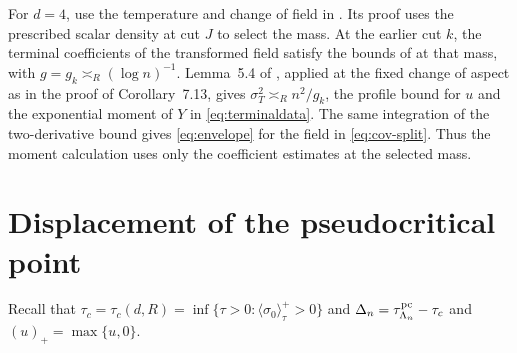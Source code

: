 \documentclass[11pt]{article}
\numberwithin{equation}{section}
\begin{document}
For $d=4$, use the temperature and change of field in
\cite[Corollary~7.13]{base}. Its proof uses the prescribed scalar
density at cut $J$ to select the mass. At the earlier cut $k$, the
terminal coefficients of the transformed field satisfy the bounds of
\cite[Proposition~7.2]{base} at that mass, with
$g=g_k\asymp_R(\log n)^{-1}$. Lemma~5.4 of \cite{base}, applied
at the fixed change of aspect as in the proof of Corollary~7.13,
gives $\sigma_T^2\asymp_R n^2/g_k$, the profile bound for $u$ and
the exponential moment of $Y$ in \eqref{eq:terminaldata}. The
same integration of the two-derivative bound gives \eqref{eq:envelope}
for the field in \eqref{eq:cov-split}. Thus the moment calculation
uses only the coefficient estimates at the selected mass.

\section{Displacement of the pseudocritical point}\label{app:shift}

Recall that $\tau_c=\tau_c(d,R)=\inf\{\tau>0:\langle\sigma_0\rangle_\tau^+>0\}$
and $\Delta_n=\tau_{\Lambda_n}^{\rm pc}-\tau_c$ and $(u)_+=\max\{u,0\}$.
\end{document}
